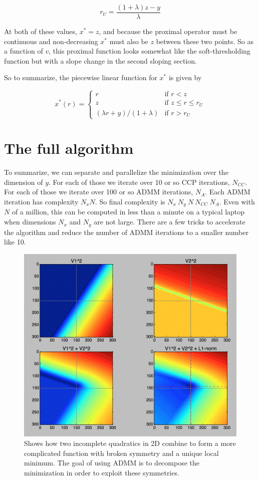 \documentclass{article}
\begin{document}
\[
r_U = \frac{(1+ \lambda)z -y}{\lambda}
\]

At both of these values, $x^*=z$, and because the proximal operator must be continuous and non-decreasing
$x^*$ must also be $z$ between these two points. So as a function of $v$, this proximal function looks
somewhat like the soft-thresholding function but with a slope change in the second sloping section.

So to summarize, the piecewise linear function for
$x^*$ is given by

\[
    x^*(r) = \begin{cases}
        r & \text{if } r < z \\
        z & \text{if } z \le r \le r_U\\
        (\lambda r + y)/(1+\lambda) & \text{if } r > r_U
        \end{cases}
  \]

\section{The full algorithm}

To summarize, we can separate and parallelize the minimization over the
dimension of $y$. For each of those we iterate over 10 or so CCP iterations,
$N_{CC}$. For each of those we iterate over 100 or so ADMM iterations, $N_A$.
Each ADMM iteration has complexity $N_x N$. So final complexity is
$N_x~N_y~N~N_{CC}~N_{A}$. Even with $N$ of a million, this can be computed in
less than a minute on a typical laptop when dimensions $N_x$ and $N_y$ are
not large. There are a few tricks to accelerate the algorithm and reduce the
number of ADMM iterations to a smaller number like 10.


\begin{figure}
  \includegraphics[width=\textwidth]{nc.png}
  \caption{Shows how two incomplete quadratics in 2D combine to form a more complicated function
  with broken symmetry and a unique local minimum. The goal of using ADMM is to decompose the minimization
  in order to exploit these symmetries.}
\end{figure}
\end{document}

